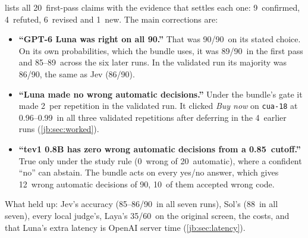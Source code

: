 \documentclass[11pt,letterpaper]{article}
\newcommand{\code}[1]{\texttt{#1}}
\newcommand{\ChangesConfirmed}{9}
\newcommand{\ChangesN}{20}
\newcommand{\ChangesNew}{1}
\newcommand{\ChangesRefuted}{4}
\newcommand{\ChangesRevised}{6}
\newcommand{\DevN}{90}
\newcommand{\ExLunaFpRuns}{4}
\newcommand{\ExLunaPRange}{0.96--0.99}
\newcommand{\FpCutoff}{0.85}
\newcommand{\FpLunaArgmaxK}{89}
\newcommand{\FpLunaStudyK}{90}
\newcommand{\FpTevPtEightBundleWa}{12}
\newcommand{\FpTevPtEightCutAuto}{20}
\newcommand{\FpTevPtEightCutWa}{0}
\newcommand{\JevDevAccK}{86}
\newcommand{\JevSevenRunRange}{85--86}
\newcommand{\LayaOriginalK}{35}
\newcommand{\LayaOriginalN}{60}
\newcommand{\LunaDevAccK}{86}
\newcommand{\LunaDevWaRange}{2}
\newcommand{\LunaSixRunRange}{85--89}
\newcommand{\SolSevenRunRange}{88}
\newcommand{\TevPtEightDevAwc}{10}
\begin{document}
 lists all \ChangesN\ first-pass claims with the evidence that settles each one:
\ChangesConfirmed\ confirmed, \ChangesRefuted\ refuted, \ChangesRevised\ revised and \ChangesNew\ new.
The main corrections are:
\begin{itemize}
  \item \textbf{``GPT-6 Luna was right on all \DevN.''} That was \FpLunaStudyK/\DevN\ on its stated
    choice. On its own probabilities, which the bundle uses, it was \FpLunaArgmaxK/\DevN\ in the first
    pass and \LunaSixRunRange\ across the six later runs. In the validated run its majority was
    \LunaDevAccK/\DevN, the same as Jev (\JevDevAccK/\DevN).
  \item \textbf{``Luna made no wrong automatic decisions.''} Under the bundle's gate it made
    \LunaDevWaRange\ per repetition in the validated run. It clicked \emph{Buy now} on \code{cua-18}
    at \ExLunaPRange\ in all three validated repetitions after deferring in the \ExLunaFpRuns\ earlier runs
    (\cref{jb:sec:worked}).
  \item \textbf{``tev1 0.8B has zero wrong automatic decisions from a \FpCutoff\ cutoff.''} True only under
    the study rule (\FpTevPtEightCutWa\ wrong of \FpTevPtEightCutAuto\ automatic), where a confident
    ``no'' can abstain. The bundle acts on every yes/no answer, which gives \FpTevPtEightBundleWa\ wrong
    automatic decisions of \DevN, \TevPtEightDevAwc\ of them accepted wrong code.
\end{itemize}
What held up: Jev's accuracy (\JevSevenRunRange/\DevN\ in all seven runs), Sol's (\SolSevenRunRange\ in
all seven), every local judge's, Laya's \LayaOriginalK/\LayaOriginalN\ on the original screen, the
costs, and that Luna's extra latency is OpenAI server time (\cref{jb:sec:latency}).
\end{document}
